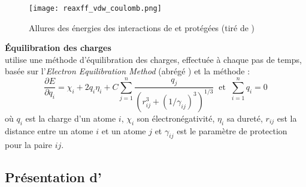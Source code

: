 \begin{figure}[h!]
    \centering
    \texttt{[image: reaxff\_vdw\_coulomb.png]}
    \caption{Allures des énergies des interactions de \vdw{} et \coulomb{} protégées {\tiny (tiré de \cite{russo_atomistic-scale_2011})}}
    \label{fig:reaxff_vdw_coulomb}
\end{figure}

\textbf{Équilibration des charges}\\
\reaxff{} utilise une méthode d'équilibration des charges, effectuée à chaque pas de temps, basée sur l'\emph{Electron Equilibration Method} (abrégé \eem{})\cite{mortier_electronegativity-equalization_2002} et la méthode \qeq{}\cite{rappe_charge_1991} :
\begin{equation}
    \boxed%
    {
    \frac{\partial E}{\partial q_i} = \chi_i + 2 q_i \eta_i + C \sum_{j = 1}^{n} \frac{q_j}{\left(r_{ij}^3 + (1 / \gamma_{ij})^3\right)^{1/3}}
    }
    \ \text{ et } \ 
    \boxed%
    {
        \sum_{i = 1}^{n} q_i = 0
    }
\end{equation}
où $q_i$ est la charge d'un atome $i$, $\chi_i$ son électronégativité, $\eta_i$ sa dureté, $r_{ij}$ est la distance entre un atome $i$ et un atome $j$ et $\gamma_{ij}$ est le paramètre de protection pour la paire $ij$.


    \subsection{Présentation d'\echemdid{}} \label{sec:echemdid}
